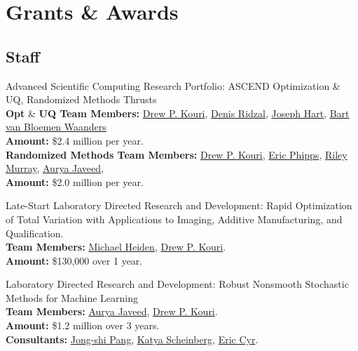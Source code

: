 \documentclass[10pt, a4paper]{article}
\newcommand{\years}[1]{\marginnote{\scriptsize #1}}
\begin{document}
\section*{Grants \& Awards}
\subsection*{Staff}
\years{2024} Advanced Scientific Computing Research Portfolio: ASCEND Optimization \& UQ, Randomized Methods Thrusts \\
\textbf{Opt} \& \textbf{UQ Team Members:}
\href{https://cfwebprod.sandia.gov/cfdocs/CompResearch/templates/insert/profile.cfm?dpkouri}{Drew P. Kouri},
\href{https://cfwebprod.sandia.gov/cfdocs/CompResearch/templates/insert/profile.cfm?dridzal}{Denis Ridzal},
\href{https://www.sandia.gov/ccr/staff/joseph-lee-hart/}{Joseph Hart},
\href{https://www.sandia.gov/ccr/staff/bart-g-van-bloemen-waanders/}{Bart van Bloemen Waanders} \\
\textbf{Amount:} \$2.4 million per year.\\
\textbf{Randomized Methods Team Members:}
\href{https://cfwebprod.sandia.gov/cfdocs/CompResearch/templates/insert/profile.cfm?dpkouri}{Drew P. Kouri},
\href{https://www.sandia.gov/ccr/staff/eric-t-phipps/}{Eric Phipps},
\href{https://rileyjmurray.wordpress.com/}{Riley Murray},
\href{https://rol.sandia.gov/team/}{Aurya Javeed}, \\
\textbf{Amount:} \$2.0 million per year.


\years{2024} Late-Start Laboratory Directed Research and Development: Rapid Optimization of Total Variation with Applications to Imaging, Additive Manufacturing, and Qualification. \\
\textbf{Team Members:} \href{https://www.sandia.gov/research/publications/search/?sort=date&format=citation&authors%5B0%5D=michael-heiden}{Michael Heiden}, \href{https://cfwebprod.sandia.gov/cfdocs/CompResearch/templates/insert/profile.cfm?dpkouri}{Drew P. Kouri}.\\
\textbf{Amount:} \$130,000 over 1 year.

\noindent
\years{2023} Laboratory Directed Research and Development: Robust Nonsmooth Stochastic Methods for Machine Learning\\
\textbf{Team Members:} \href{https://rol.sandia.gov/team/}{Aurya Javeed},
\href{https://cfwebprod.sandia.gov/cfdocs/CompResearch/templates/insert/profile.cfm?dpkouri}{Drew P. Kouri}.\\
\textbf{Amount:} \$1.2 million over 3 years.\\
\textbf{Consultants:} \href{https://viterbi.usc.edu/directory/faculty/Pang/Jong-Shi}{Jong-shi Pang}, \href{https://www.orie.cornell.edu/faculty-directory/katya-scheinberg}{Katya Scheinberg}, \href{https://www.sandia.gov/ccr/staff/eric-christopher-cyr/}{Eric Cyr}.
\noindent
\end{document}

